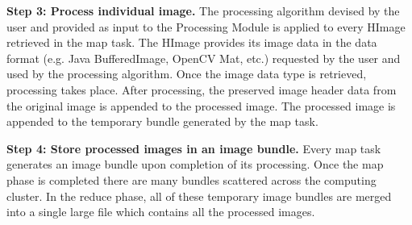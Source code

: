 \documentclass{osuthesis}
\begin{document}
				\textbf{Step 3: Process individual image.}  The processing algorithm
				devised by the user and provided as input to the Processing Module is
				applied to every HImage retrieved in the map task.  The HImage
				provides its image data in the data format (e.g. Java BufferedImage,
				OpenCV Mat, etc.) requested by the user and used by the processing
				algorithm. Once the image data type is retrieved, processing takes
				place. After processing, the preserved image header data from the
				original image is appended to the processed image. The processed image
				is appended to the temporary bundle generated by the map task.
				
				\textbf{Step 4: Store processed images in an image bundle.} Every map
				task generates an image bundle upon completion of its processing.
				Once the map phase is completed there are many bundles scattered
				across the computing cluster.  In the reduce phase, all of these
				temporary image bundles are merged into a single large file which
				contains all the processed images.
				
				
\end{document}

